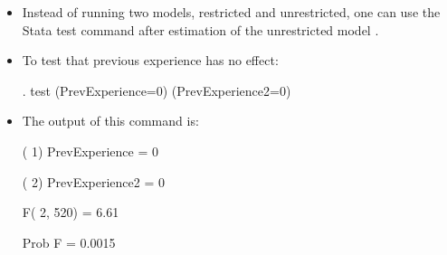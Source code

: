 \documentclass[notes=show,compress,beamer]{beamer}
\begin{document}
\begin{frame}
%


\begin{itemize}
\item Instead of running two models, restricted and unrestricted, one can
use the Stata 
\color{blue}%
test 
\color{black}%
command after estimation of the 
\color{red}%
unrestricted model%
\color{black}%
.%
\pause%

\item To test that previous experience has no effect:\medskip 
\begin{semiverbatim}%

. test (PrevExperience=0) (PrevExperience2=0)%
\end{semiverbatim}%
\pause%

\item The output of this command is:\medskip 
\begin{semiverbatim}%

( 1) PrevExperience = 0

( 2) PrevExperience2 = 0

F( 2, 520) = 6.61

Prob \TEXTsymbol{>} F = 0.0015

\end{semiverbatim}%
\end{itemize}

\end{frame}%
\end{document}
